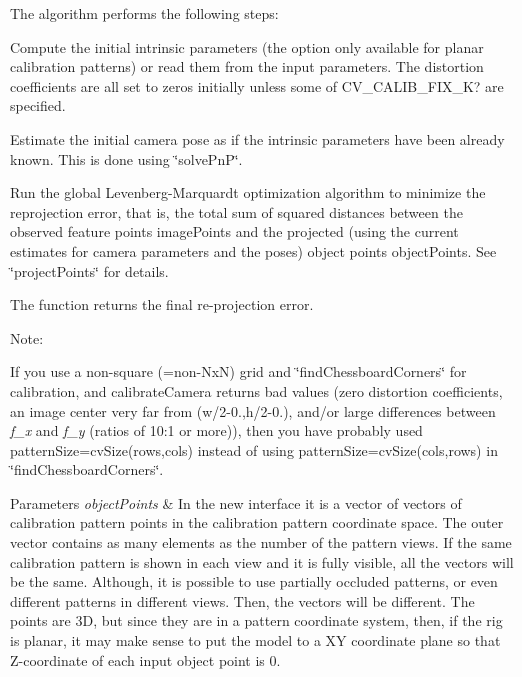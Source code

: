 The algorithm performs the following steps\+:


\begin{DoxyItemize}
\item Compute the initial intrinsic parameters (the option only available for planar calibration patterns) or read them from the input parameters. The distortion coefficients are all set to zeros initially unless some of {\ttfamily C\+V\+\_\+\+C\+A\+L\+I\+B\+\_\+\+F\+I\+X\+\_\+K?} are specified. 
\item Estimate the initial camera pose as if the intrinsic parameters have been already known. This is done using \char`\"{}solve\+Pn\+P\char`\"{}. 
\item Run the global Levenberg-\/\+Marquardt optimization algorithm to minimize the reprojection error, that is, the total sum of squared distances between the observed feature points {\ttfamily image\+Points} and the projected (using the current estimates for camera parameters and the poses) object points {\ttfamily object\+Points}. See \char`\"{}project\+Points\char`\"{} for details. 
\end{DoxyItemize}

The function returns the final re-\/projection error.

Note\+:

If you use a non-\/square (=non-\/\+NxN) grid and \char`\"{}find\+Chessboard\+Corners\char`\"{} for calibration, and {\ttfamily calibrate\+Camera} returns bad values (zero distortion coefficients, an image center very far from {\ttfamily (w/2-\/0.,h/2-\/0.)}, and/or large differences between {\itshape f\+\_\+x} and {\itshape f\+\_\+y} (ratios of 10\+:1 or more)), then you have probably used {\ttfamily pattern\+Size=cv\+Size(rows,cols)} instead of using {\ttfamily pattern\+Size=cv\+Size(cols,rows)} in \char`\"{}find\+Chessboard\+Corners\char`\"{}.


\begin{DoxyParams}{Parameters}
{\em object\+Points} & In the new interface it is a vector of vectors of calibration pattern points in the calibration pattern coordinate space. The outer vector contains as many elements as the number of the pattern views. If the same calibration pattern is shown in each view and it is fully visible, all the vectors will be the same. Although, it is possible to use partially occluded patterns, or even different patterns in different views. Then, the vectors will be different. The points are 3D, but since they are in a pattern coordinate system, then, if the rig is planar, it may make sense to put the model to a XY coordinate plane so that Z-\/coordinate of each input object point is 0.\\
\hline
\end{DoxyParams}


